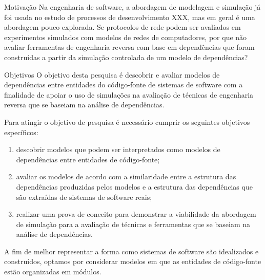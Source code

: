 \begin{section}{Motivação}
		Na engenharia de software, a abordagem de modelagem e simulação já foi usada no estudo de processos de desenvolvimento XXX, mas em geral é uma abordagem pouco explorada. Se protocolos de rede podem ser avaliados em experimentos simulados com modelos de redes de computadores, por que não avaliar ferramentas de engenharia reversa com base em dependências que foram construídas a partir da simulação controlada de um modelo de dependências?\end{section}

\begin{section}{Objetivos}
	O objetivo desta pesquisa é descobrir e avaliar modelos de dependências entre entidades do código-fonte de sistemas de software com a finalidade de apoiar o uso de simulações na avaliação de técnicas de engenharia reversa que se baseiam na análise de dependências.
	
	Para atingir o objetivo de pesquisa é necessário cumprir os seguintes objetivos específicos:
	
	\begin{enumerate}
		\item descobrir modelos que podem ser interpretados como modelos de dependências entre entidades de código-fonte;
		\item avaliar os modelos de acordo com a similaridade entre a estrutura das dependências produzidas pelos modelos e a estrutura das dependências que são extraídas de sistemas de software reais;
		\item realizar uma prova de conceito para demonstrar a viabilidade da abordagem de simulação para a avaliação de técnicas e ferramentas que se baseiam na análise de dependências.
	\end{enumerate}
	
	A fim de melhor representar a forma como sistemas de software são idealizados e construídos, optamos por considerar modelos em que as entidades de código-fonte estão organizadas em módulos. %
	
\end{section}

